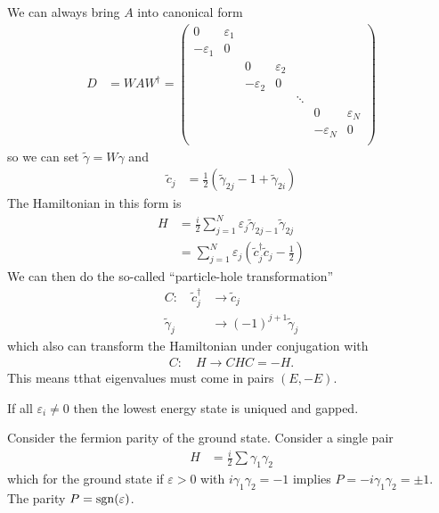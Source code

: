 We can always bring $A$ into canonical form
\begin{align}
    D &= WAW^\dagger =
    \begin{pmatrix}
        0 & \varepsilon_1 & & & & & \\
        -\varepsilon_1 & 0 & & & & & \\
        & & 0 & \varepsilon_2 & & & \\
        & & -\varepsilon_2 & 0 & & &\\
        & & & & \ddots & &\\
        & & & & & 0 & \varepsilon_N\\
        & & & & & -\varepsilon_N & 0\\
    \end{pmatrix}
\end{align}
so we can set $\tilde{\gamma} = W\gamma$
and
\begin{align}
    \tilde{c}_j &= \frac{1}{2}\left( \tilde{\gamma}_{2j} - 1
    + \tilde{\gamma}_{2i}\right)
\end{align}
The Hamiltonian in this form is
\begin{align}
    H &=
    \frac{i}{2}\sum_{j=1}^{N}
    \varepsilon_j \tilde{\gamma}_{2j - 1} \tilde{\gamma}_{2j}\\
    &=
    \sum_{j=1}^{N} \varepsilon_j\left( \tilde{c}_j^\dagger \tilde{c}_j -
    \frac{1}{2}\right)
\end{align}
We can then do the so-called ``particle-hole transformation''
\begin{align}
    C: \quad
    \tilde{c}_j^\dagger &\to \tilde{c}_j\\
    \tilde{\gamma}_j &\to {(-1)}^{j+1}\tilde{\gamma}_j
\end{align}
which also can transform the Hamiltonian under conjugation with
\begin{align}
    C:\quad
    H\to CHC = -H.
\end{align}
This means tthat eigenvalues must come in pairs $(E, -E)$.

If all $\varepsilon_i \ne 0$
then the lowest energy state is uniqued and gapped.


Consider the fermion parity of the ground state.
Consider a single pair
\begin{align}
    H &= \frac{i}{2} \sum \gamma_1 \gamma_2
\end{align}
which for the ground state if $\varepsilon > 0$ with
$i\gamma_1 \gamma_2 = -1$
implies
$P = -i \gamma_1 \gamma_2 = \pm 1$.
The parity $P=\operatorname{sgn}(\varepsilon)$.

